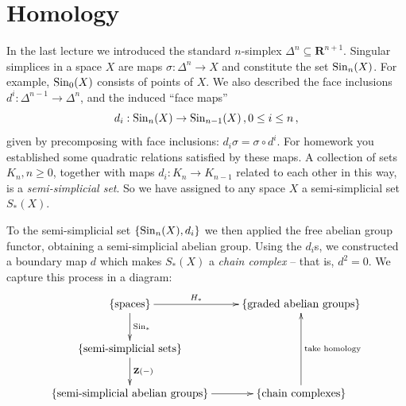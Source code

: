 
\section{Homology}
In the last lecture we introduced the standard $n$-simplex $\Delta^n\subseteq\mathbf{R}^{n+1}$. Singular simplices in a space $X$ are maps $\sigma\colon\Delta^n\to X$ and constitute the set $\mathrm{Sin}_n(X)$. For example, $\mathrm{Sin}_0(X)$ consists of points of $X$. We also described the face inclusions $d^i:\Delta^{n-1}\to\Delta^n$, and the induced ``face maps'' 
\[
d_i:\mathrm{Sin}_n(X)\to\mathrm{Sin}_{n-1}(X)\,,0\leq i\leq n\,,
\]
given by precomposing with face inclusions: $d_i\sigma=\sigma\circ d^i$. 
For homework you established some quadratic relations satisfied by these maps.
A collection of sets $K_n,n\geq0$, together with maps $d_i:K_n\to K_{n-1}$
related to each other in this way, is a {\em semi-simplicial set}. 
So we have assigned to any space $X$ a semi-simplicial set $S_*(X)$. 

To the semi-simplicial set $\{\mathrm{Sin}_n(X),d_i\}$ we then applied the free abelian group functor, obtaining a semi-simplicial abelian group. Using the $d_i$s, we constructed a boundary map $d$ which makes $S_\ast(X)$ a \emph{chain complex} -- that is, $d^2=0$. We capture this process in a diagram:
\begin{equation*}
\xymatrix{
\{\text{spaces}\}\ar[d]^{\Sin_*}\ar[r]^-{H_*} & 
\{\text{graded abelian groups}\} \\
\{\text{semi-simplicial sets}\}\ar[d]^{\mathbf{Z}(-)} \\ 
\{\text{semi-simplicial abelian groups}\}\ar[r] & 
\{\text{chain complexes}\}\ar[uu]_{\text{take homology}}\\
}\end{equation*}

